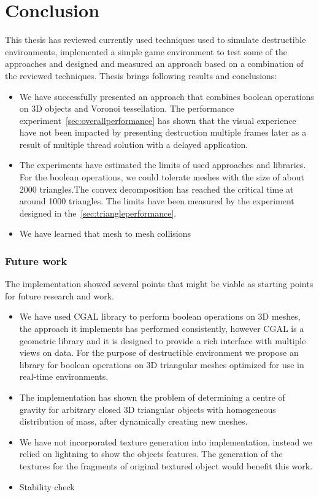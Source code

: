 \chapter*{Conclusion}

This thesis has reviewed currently used techniques used to simulate destructible environments, implemented a simple game environment to test some of the approaches and designed and measured an approach based on a combination of the reviewed techniques. Thesis brings following results and conclusions:

\begin{itemize}
\item We have successfully presented an approach that combines boolean operations on 3D objects and Voronoi tessellation. The performance experiment~\cref{sec:overallperformance} has shown that the visual experience have not been impacted by presenting destruction multiple frames later as a result of multiple thread solution with a delayed application.

\item The experiments have estimated the limits of used approaches and libraries. 
For the boolean operations, we could tolerate meshes with the size of about 2000 triangles.The convex decomposition has reached the critical time at around 1000 triangles. The limits have been measured by the experiment designed in the~\cref{sec:triangleperformance}. 

\item We have learned that mesh to mesh collisions
\end{itemize}


\subsection*{Future work}
The implementation showed several points that might be viable as starting points for future research and work.
\begin{itemize}
\item We have used CGAL library to perform boolean operations on 3D meshes, the approach it implements has performed consistently, however CGAL is a geometric library and it is designed to provide a rich interface with multiple views on data. For the purpose of destructible environment we propose an library for boolean operations on 3D triangular meshes optimized for use in real-time environments.
\item The implementation has shown the problem of determining a centre of gravity for arbitrary closed 3D triangular objects with homogeneous distribution of mass, after dynamically creating new meshes.
\item We have not incorporated texture generation into implementation, instead we relied on lightning to show the objects features. The generation of the textures for the fragments of original textured object would benefit this work.
\item Stability check
\end{itemize}

